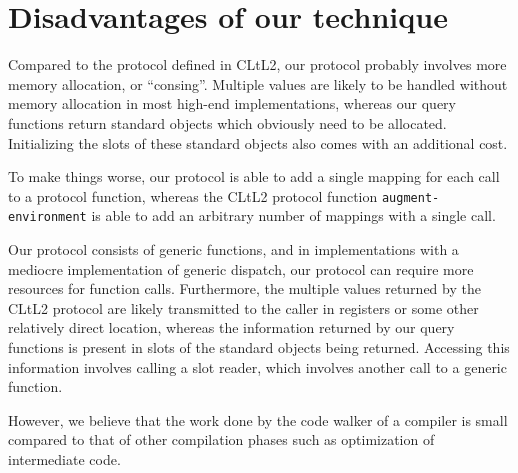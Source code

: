 \section{Disadvantages of our technique}

Compared to the protocol defined in CLtL2, our protocol probably
involves more memory allocation, or ``consing''.  Multiple values are
likely to be handled without memory allocation in most high-end
\commonlisp{} implementations, whereas our query functions return
standard objects which obviously need to be allocated.  Initializing
the slots of these standard objects also comes with an additional
cost.

To make things worse, our protocol is able to add a single mapping for
each call to a protocol function, whereas the CLtL2 protocol function
\texttt{augment-environment} is able to add an arbitrary number of
mappings with a single call.

Our protocol consists of generic functions, and in implementations
with a mediocre implementation of generic dispatch, our protocol can
require more resources for function calls.  Furthermore, the multiple
values returned by the CLtL2 protocol are likely transmitted to the
caller in registers or some other relatively direct location, whereas
the information returned by our query functions is present in slots of
the standard objects being returned.  Accessing this information
involves calling a slot reader, which involves another call to a
generic function.

However, we believe that the work done by the code walker of a
compiler is small compared to that of other compilation phases such as
optimization of intermediate code.
